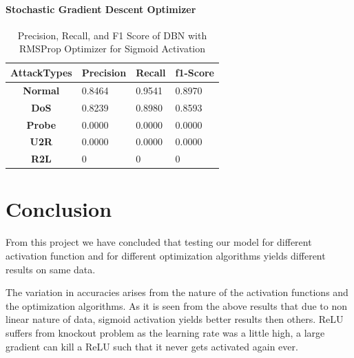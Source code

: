 \documentclass[12pt, a4paper]{report}
\begin{document}
\subsubsection{Stochastic Gradient Descent Optimizer}
\begin{table}[ht]
\centering
\captionsetup{justification=centering,margin=2cm}
\begin{tabular}{|c|l|l|l|}
\hline
\textbf{AttackTypes} & \multicolumn{1}{c|}{\textbf{Precision}} & \multicolumn{1}{c|}{\textbf{Recall}} & \multicolumn{1}{c|}{\textbf{f1-Score}} \\ \hline
\textbf{Normal}      & 0.8464                                  & 0.9541                               & 0.8970                                 \\ \hline
\textbf{DoS}         & 0.8239                                  & 0.8980                               & 0.8593                                 \\ \hline
\textbf{Probe}       & 0.0000                                  & 0.0000                               & 0.0000                                 \\ \hline
\textbf{U2R}         & 0.0000                                  & 0.0000                               & 0.0000                                 \\ \hline
\textbf{R2L}         & 0                                       & 0                                    & 0                                      \\ \hline
\end{tabular}
\caption{Precision, Recall, and F1 Score of DBN with RMSProp Optimizer for Sigmoid Activation}
\label{prf1_sgd_dbn}
\end{table}
\clearpage
\chapter{Conclusion}

From this project we have concluded that testing our model for different activation function and for different optimization algorithms yields different results on same data. 
\\ \par
The variation in accuracies arises from the nature of the activation functions and the optimization algorithms. As it is seen from the above results that due to non linear nature of data, sigmoid activation yields better results then others. ReLU suffers from knockout problem as the learning rate was a little high, a large gradient can kill a ReLU such that it never gets activated again ever. \\ \par
\end{document}
